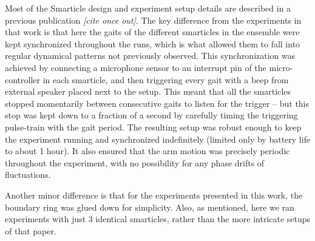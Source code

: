 \documentclass[reprint,prx]{revtex4-1}
\renewcommand{\=}[1]{\stackrel{#1}{=}} %
\renewcommand{\(}{\left (}
\renewcommand{\)}{\right  )}
\renewcommand{\[}{\left [}
\renewcommand{\]}{\right ]}
\newcommand{\<}{\left <}
\renewcommand{\>}{\right >}
\theoremstyle{definition}
\theoremstyle{remark}
\renewcommand{\todo}[1]{\textit{\color{red}[#1]}}
\begin{document}
Most of the Smarticle design and experiment setup details are described in a previous publication \todo{cite once out}. The key difference from the experiments in that work is that here the gaits of the different smarticles in the ensemble were kept synchronized throughout the runs, which is what allowed them to fall into regular dynamical patterns not previously observed. This synchronization was achieved by connecting a microphone sensor to an interrupt pin of the micro-controller in each smarticle, and then triggering every gait with a beep from external speaker placed next to the setup. This meant that all the smarticles stopped momentarily between consecutive gaits to listen for the trigger -- but this stop was kept down to a fraction of a second by carefully timing the triggering pulse-train with the gait period. The resulting setup was robust enough to keep the experiment running and synchronized indefinitely (limited only by battery life to about 1 hour). It also ensured that the arm motion was precisely periodic throughout the experiment, with no possibility for any phase drifts of fluctuations.  

Another minor difference is that for the experiments presented in this work, the boundary ring was glued down for simplicity. Also, as mentioned, here we ran experiments with just 3 identical smarticles, rather than the more intricate setups of that paper. 
\end{document}
